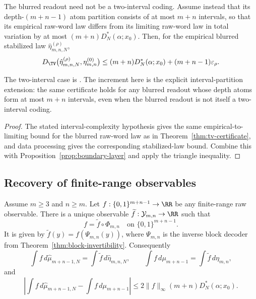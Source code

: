 \begin{corollary}\label{cor:resolution-certificate}
The blurred readout need not be a two-interval coding. Assume instead that its
depth-$(m+n-1)$ atom partition consists of at most $m+n$ intervals, so that its
empirical raw-word law differs from its limiting raw-word law in total
variation by at most $(m+n)D_N^*(\alpha;x_0)$. Then, for the empirical blurred
stabilized law $\hat{\eta}_{m,n,N}^{(\rho)}$,
\[
D_{\TV}\bigl(\hat{\eta}_{m,n,N}^{(\rho)},\eta_{m,n}^{(0)}\bigr)
\le
(m+n)D_N^*(\alpha;x_0)+(m+n-1)\varepsilon_\rho.
\]
\end{corollary}

\begin{remark}
The two-interval case is \cite[Corollary~8.4]{MaZhang2026Nonlinearity}. The
increment here is the explicit interval-partition extension: the same
certificate holds for any blurred readout whose depth atoms form at most
$m+n$ intervals, even when the blurred readout is not itself a two-interval
coding.
\end{remark}

\begin{proof}
The stated interval-complexity hypothesis gives the same empirical-to-limiting
bound for the blurred raw-word law as in Theorem~\ref{thm:tv-certificate}, and
data processing gives the corresponding stabilized-law bound. Combine this with
Proposition~\ref{prop:boundary-layer} and apply the triangle inequality.
\end{proof}

\subsection{Recovery of finite-range observables}

\begin{theorem}\label{thm:operational-observable-recovery}
Assume $m\ge3$ and $n\ge m$.  Let
$f:\{0,1\}^{m+n-1}\to\RR$ be any finite-range raw observable.  There is a
unique observable $\widetilde f:\mathcal Y_{m,n}\to\RR$ such that
\[
f=\widetilde f\circ\Phi_{m,n}
\quad\text{on }\{0,1\}^{m+n-1}.
\]
It is given by $\widetilde f(y)=f(\Psi_{m,n}(y))$, where
$\Psi_{m,n}$ is the inverse block decoder from
Theorem~\ref{thm:block-invertibility}.  Consequently
\[
\int f\,d\hat{\mu}_{m+n-1,N}
=
\int \widetilde f\,d\hat{\eta}_{m,n,N},
\qquad
\int f\,d\mu_{m+n-1}
=
\int \widetilde f\,d\eta_{m,n},
\]
and
\[
\left|
\int f\,d\hat{\mu}_{m+n-1,N}
-
\int f\,d\mu_{m+n-1}
\right|
\le
2\|f\|_\infty (m+n)D_N^*(\alpha;x_0).
\]
\end{theorem}

